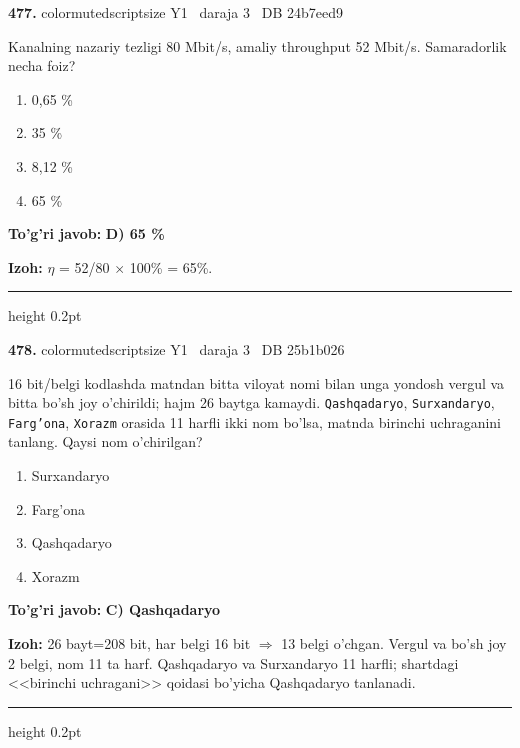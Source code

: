 \documentclass[10pt,a4paper,oneside]{article}
\begin{document}
\noindent\textbf{\color{ink}477.}  {color{muted}scriptsize Y1 \textbullet\ daraja 3 \textbullet\ DB 24b7eed9}
\par
Kanalning nazariy tezligi 80 Mbit/s, amaliy throughput 52 Mbit/s. Samaradorlik necha foiz?
\begin{enumerate}[label=\Alph*),leftmargin=9mm]
\item 0,65 \%
\item 35 \%
\item 8,12 \%
\item 65 \%
\end{enumerate}
\begin{tcolorbox}[enhanced,breakable,colback=teal!4,colframe=teal!50!black,boxrule=0.5pt,arc=1.1mm,left=3mm,right=3mm,top=1.7mm,bottom=1.7mm,before skip=2mm,after skip=2mm]
\textbf{\color{teal}To'g'ri javob:} \textbf{D) 65 \%}
\par\smallskip
\textbf{Izoh:} \ensuremath{\eta} = 52/80 \ensuremath{\times} 100\% = 65\%.
\end{tcolorbox}
\vspace{2mm}\hrule height 0.2pt \vspace{3mm}

\noindent\textbf{\color{ink}478.}  {color{muted}scriptsize Y1 \textbullet\ daraja 3 \textbullet\ DB 25b1b026}
\par
16 bit/belgi kodlashda matndan bitta viloyat nomi bilan unga yondosh vergul va bitta bo'sh joy o'chirildi; hajm 26 baytga kamaydi. \texttt{Qashqadaryo}, \texttt{Surxandaryo}, \texttt{Farg'ona}, \texttt{Xorazm} orasida 11 harfli ikki nom bo'lsa, matnda birinchi uchraganini tanlang. Qaysi nom o'chirilgan?
\begin{enumerate}[label=\Alph*),leftmargin=9mm]
\item Surxandaryo
\item Farg'ona
\item Qashqadaryo
\item Xorazm
\end{enumerate}
\begin{tcolorbox}[enhanced,breakable,colback=teal!4,colframe=teal!50!black,boxrule=0.5pt,arc=1.1mm,left=3mm,right=3mm,top=1.7mm,bottom=1.7mm,before skip=2mm,after skip=2mm]
\textbf{\color{teal}To'g'ri javob:} \textbf{C) Qashqadaryo}
\par\smallskip
\textbf{Izoh:} 26 bayt=208 bit, har belgi 16 bit \ensuremath{\Rightarrow} 13 belgi o'chgan. Vergul va bo'sh joy 2 belgi, nom 11 ta harf. Qashqadaryo va Surxandaryo 11 harfli; shartdagi <<birinchi uchragani>> qoidasi bo'yicha Qashqadaryo tanlanadi.
\end{tcolorbox}
\vspace{2mm}\hrule height 0.2pt \vspace{3mm}
\end{document}

